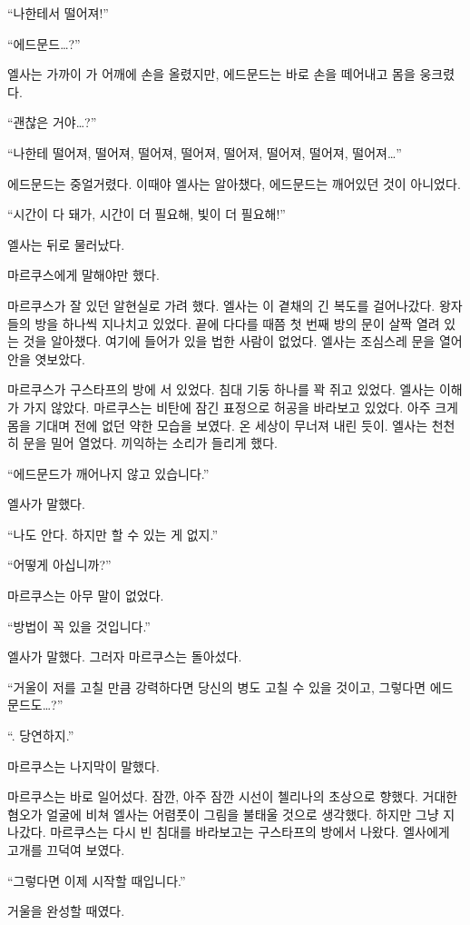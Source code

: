 ``나한테서 떨어져!''

``에드문드\ldots?''

엘사는 가까이 가 어깨에 손을 올렸지만, 에드문드는 바로 손을 떼어내고 몸을 웅크렸다.

``괜찮은 거야\ldots?''

``나한테 떨어져, 떨어져, 떨어져, 떨어져, 떨어져, 떨어져, 떨어져, 떨어져\ldots''

에드문드는 중얼거렸다. 이때야 엘사는 알아챘다, 에드문드는 깨어있던 것이 아니었다.

``시간이 다 돼가, 시간이 더 필요해, 빛이 더 필요해!''

엘사는 뒤로 물러났다.

마르쿠스에게 말해야만 했다.

마르쿠스가 잘 있던 알현실로 가려 했다. 엘사는 이 곁채의 긴 복도를 걸어나갔다. 왕자들의 방을 하나씩 지나치고 있었다. 끝에 다다를 때쯤 첫 번째 방의 문이 살짝 열려 있는 것을 알아챘다. 여기에 들어가 있을 법한 사람이 없었다. 엘사는 조심스레 문을 열어 안을 엿보았다.

마르쿠스가 구스타프의 방에 서 있었다. 침대 기둥 하나를 꽉 쥐고 있었다. 엘사는 이해가 가지 않았다. 마르쿠스는 비탄에 잠긴 표정으로 허공을 바라보고 있었다. 아주 크게 몸을 기대며 전에 없던 약한 모습을 보였다. 온 세상이 무너져 내린 듯이. 엘사는 천천히 문을 밀어 열었다. 끼익하는 소리가 들리게 했다.

``에드문드가 깨어나지 않고 있습니다.''

엘사가 말했다.

``나도 안다. 하지만 할 수 있는 게 없지.''

``어떻게 아십니까?''

마르쿠스는 아무 말이 없었다.

``방법이 꼭 있을 것입니다.''

엘사가 말했다. 그러자 마르쿠스는 돌아섰다.

``거울이 저를 고칠 만큼 강력하다면 당신의 병도 고칠 수 있을 것이고, 그렇다면 에드문드도\ldots?''

``. 당연하지.''

마르쿠스는 나지막이 말했다.

마르쿠스는 바로 일어섰다. 잠깐, 아주 잠깐 시선이 첼리나의 초상으로 향했다. 거대한 혐오가 얼굴에 비쳐 엘사는 어렴풋이 그림을 불태울 것으로 생각했다. 하지만 그냥 지나갔다. 마르쿠스는 다시 빈 침대를 바라보고는 구스타프의 방에서 나왔다. 엘사에게 고개를 끄덕여 보였다.

``그렇다면 이제 시작할 때입니다.''

거울을 완성할 때였다.

